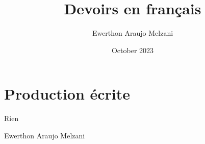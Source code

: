 \documentclass{article}
\title{Devoirs en français}
\author{Ewerthon Araujo Melzani}
\date{October 2023}
\begin{document}
\maketitle

\section*{Production écrite}


Rien



Ewerthon Araujo Melzani
\end{document}

